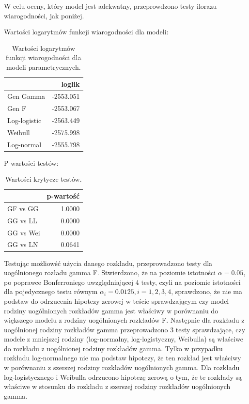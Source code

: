 \documentclass[]{article}
\begin{document}
W celu oceny, który model jest adekwatny, przeprowdzono testy ilorazu
wiarogodności, jak poniżej.

Wartości logarytmów funkcji wiarogodności dla modeli:

\begin{table}[hbt!]
\centering
\begin{tabular}{lr}
\toprule%
  & loglik\\ \toprule%

Gen Gamma & -2553.051\\

Gen F & -2553.067\\

Log-logistic & -2563.449\\

Weibull & -2575.998\\

Log-normal & -2555.798\\
\bottomrule
\end{tabular}
\caption{Wartości logarytmów funkcji wiarogodności dla modeli parametrycznych.}
\end{table}

P-wartości testów:

\begin{table}[hbt!]
\centering
\begin{tabular}{lr}
\toprule%
  & p-wartość\\
\toprule%
GF vs GG & 1.0000\\

GG vs LL & 0.0000\\

GG vs Wei & 0.0000\\

GG vs LN & 0.0641\\
\bottomrule
\end{tabular}
\caption{Wartości krytycze testów.}
\end{table}

Testując możliowść użycia danego rozkładu, przeprowadzono testy dla
uogólnionego rozładu gamma  F. Stwierdzono, że na
poziomie istotności $\alpha=0.05$, po poprawce Bonferroniego
uwzględniającej 4 testy, czyli na poziomie istotności dla pojedycznego
testu równym $\alpha_i = 0.0125, i =1,2,3,4$, sprawdzono, że nie ma
podstaw do odrzucenia hipotezy zerowej w teście sprawdzającym czy model
 rodziny uogólnionych rozkładów gamma jest właściwy w
porównaniu do większego modelu z rodziny uogólnionych rozkładów F.
Następnie dla rozkładu z uogólnionej rodziny rozkładów gamma
przeprowadzono 3 testy sprawdzające, czy modele z mniejszej rodziny
(log-normalny, log-logistyczny, Weibulla) są właściwe
 do rozkładu z uogólnionej rodziny rozkładów gamma.
Tylko w przypadku rozkładu log-normalnego nie ma podstaw
 hipotezy, że ten rozkład jest właściwy w porównaniu
 z szerszej rodziny rozkładów uogólnionych gamma. Dla
rozkładu log-logistycznego i Weibulla odrzucono hipotezę zerową o tym,
że te rozkłady są właściwe w stosunku do rozkładu z szerszej rodziny
rozkładów uogólnionych gamma.
\end{document}
